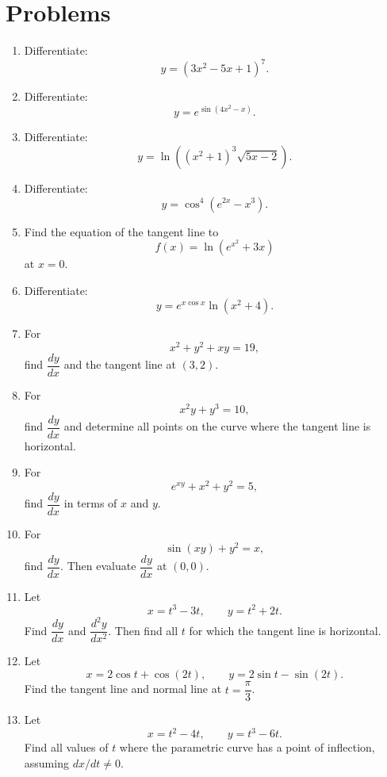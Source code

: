 \documentclass[12pt]{article}
\begin{document}
\section*{Problems}
\begin{enumerate}[leftmargin=*, itemsep=1em, topsep=0.8em]
  \item Differentiate:
  \[
  y=\left(3x^2-5x+1\right)^7.
  \]

  \item Differentiate:
  \[
  y=e^{\sin(4x^2-x)}.
  \]

  \item Differentiate:
  \[
  y=\ln\left((x^2+1)^3\sqrt{5x-2}\right).
  \]

  \item Differentiate:
  \[
  y=\cos^4\left(e^{2x}-x^3\right).
  \]

  \item Find the equation of the tangent line to
  \[
  f(x)=\ln\left(e^{x^2}+3x\right)
  \]
  at $x=0$.

  \item Differentiate:
  \[
  y=e^{x\cos x}\ln(x^2+4).
  \]

  \item For
  \[
  x^2+y^2+xy=19,
  \]
  find $\dfrac{dy}{dx}$ and the tangent line at $(3,2)$.

  \item For
  \[
  x^2y+y^3=10,
  \]
  find $\dfrac{dy}{dx}$ and determine all points on the curve where the tangent line is horizontal.

  \item For
  \[
  e^{xy}+x^2+y^2=5,
  \]
  find $\dfrac{dy}{dx}$ in terms of $x$ and $y$.

  \item For
  \[
  \sin(xy)+y^2=x,
  \]
  find $\dfrac{dy}{dx}$. Then evaluate $\dfrac{dy}{dx}$ at $(0,0)$.

  \item Let
  \[
  x=t^3-3t,\qquad y=t^2+2t.
  \]
  Find $\dfrac{dy}{dx}$ and $\dfrac{d^2y}{dx^2}$. Then find all $t$ for which the tangent line is horizontal.

  \item Let
  \[
  x=2\cos t+\cos(2t),\qquad y=2\sin t-\sin(2t).
  \]
  Find the tangent line and normal line at $t=\dfrac{\pi}{3}$.

  \item Let
  \[
  x=t^2-4t,\qquad y=t^3-6t.
  \]
  Find all values of $t$ where the parametric curve has a point of inflection, assuming $dx/dt\ne 0$.


\end{enumerate}
\end{document}
